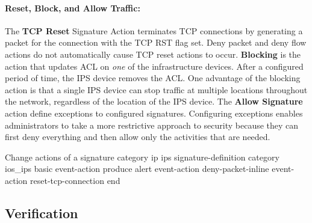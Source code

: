 \paragraph{Reset, Block, and Allow Traffic:} The \textbf{TCP Reset} Signature Action terminates TCP connections by generating a packet for the connection with the TCP RST flag set. Deny packet and deny flow actions do not automatically cause TCP reset actions to occur. \textbf{Blocking} is the action that updates ACL on \emph{one} of the infrastructure devices. After a configured period of time, the IPS device removes the ACL. One advantage of the blocking action is that a single IPS device can stop traffic at multiple locations throughout the network, regardless of the location of the IPS device. The \textbf{Allow Signature} action define exceptions to configured signatures. Configuring exceptions enables administrators to take a more restrictive approach to security because they can first deny everything and then allow only the activities that are needed.

\begin{sexylisting}{Change actions of a signature category}
ip ips signature-definition
  category ios_ips basic
    event-action produce alert
    event-action deny-packet-inline
    event-action reset-tcp-connection
end  
\end{sexylisting}

\subsection{Verification}